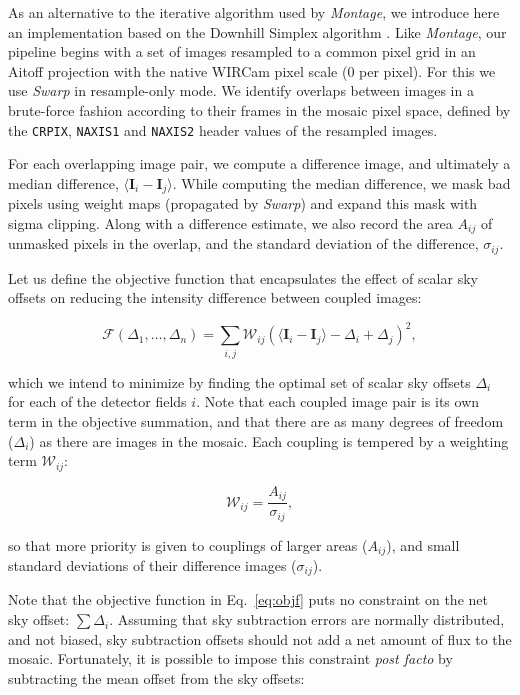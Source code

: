 \documentclass[iop]{emulateapj}
\newcommand{\vect}[1]{\boldsymbol{#1}} %
\newcommand{\sw}[1]{\textit{#1}} %
\newcommand{\Eq}[1]{Eq.~\ref{eq:#1}}  %
\begin{document}
As an alternative to the iterative algorithm used by \sw{Montage}, we introduce here an implementation based on the Downhill Simplex algorithm \cite[][hereafter, NM]{Nelder:1965}.
Like \sw{Montage}, our pipeline begins with a set of images resampled to a common pixel grid in an Aitoff projection with the native WIRCam pixel scale (0 per pixel).
For this we use \sw{Swarp} in resample-only mode.
We identify overlaps between images in a brute-force fashion according to their frames in the mosaic pixel space, defined by the \texttt{CRPIX}, \texttt{NAXIS1} and \texttt{NAXIS2} header values of the resampled images.

For each overlapping image pair, we compute a difference image, and ultimately a median difference, $\langle \vect{I}_i - \vect{I}_j \rangle$.
While computing the median difference, we mask bad pixels using weight maps (propagated by \sw{Swarp}) and expand this mask with sigma clipping.
Along with a difference estimate, we also record the area $A_{ij}$ of unmasked pixels in the overlap, and the standard deviation of the difference, $\sigma_{ij}$.

Let us define the objective function that encapsulates the effect of scalar sky offsets on reducing the intensity difference between coupled images:

\begin{equation}
    \mathcal{F} \left(\Delta_1,\ldots,\Delta_n \right) = \sum_{i,j} \mathcal{W}_{ij} \left( \langle \vect{I}_i - \vect{I}_j \rangle - \Delta_i + \Delta_j \right)^2,
    \label{eq:objf}
\end{equation}

\noindent which we intend to minimize by finding the optimal set of scalar sky offsets $\Delta_i$ for each of the detector fields $i$.
Note that each coupled image pair is its own term in the objective summation, and that there are as many degrees of freedom ($\Delta_i$) as there are images in the mosaic.
Each coupling is tempered by a weighting term $\mathcal{W}_{ij}$:

\begin{equation}
    \mathcal{W}_{ij} = \frac{A_{ij}}{\sigma_{ij}},
\end{equation}

\noindent so that more priority is given to couplings of larger areas ($A_{ij}$), and small standard deviations of their difference images ($\sigma_{ij}$).

Note that the objective function in \Eq{objf} puts no constraint on the net sky offset: $\sum \Delta_i$.
Assuming that sky subtraction errors are normally distributed, and not biased, sky subtraction offsets should not add a net amount of flux to the mosaic.
Fortunately, it is possible to impose this constraint \textit{post facto} by subtracting the mean offset from the sky offsets:
\end{document}
